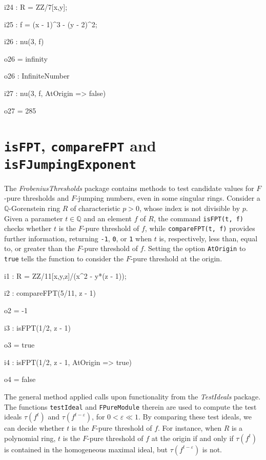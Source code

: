 \documentclass{amsart}
\begin{document}
\smallskip
{\small
{}
\begin{MyVerbatim}
i24 : R = ZZ/7[x,y];

i25 : f = (x - 1)^3 - (y - 2)^2;

i26 : nu(3, f)

o26 = infinity

o26 : InfiniteNumber

i27 : nu(3, f, AtOrigin => false)

o27 = 285
\end{MyVerbatim}
}

\section{{\tt isFPT}, {\tt compareFPT} and {\tt isFJumpingExponent}}
\label{sec.IsFPT}

The \emph{FrobeniusThresholds} package contains methods to test candidate values for $F$-pure thresholds and $F$-jumping numbers, even in some singular rings.
Consider a  $\mathbb{Q}$-Gorenstein ring $R$ of characteristic $p>0$, whose index is not divisible by $p$.
Given a parameter $t\in \mathbb{Q}$ and an element $f$ of $R$, the command \texttt{isFPT(t, f)} checks whether $t$ is the $F$-pure threshold of $f$, while \texttt{compareFPT(t, f)} provides further information, returning {\tt-1}, \texttt{0}, or \texttt{1} when $t$ is, respectively, less than, equal to, or greater than the $F$-pure threshold of $f$.  Setting the option \texttt{AtOrigin} to \texttt{true} tells the function to consider the $F$-pure threshold at the origin.  %

\smallskip
{\small
{}
\begin{MyVerbatim}
i1 : R = ZZ/11[x,y,z]/(x^2 - y*(z - 1));

i2 : compareFPT(5/11, z - 1)

o2 = -1

i3 : isFPT(1/2, z - 1)

o3 = true

i4 : isFPT(1/2, z - 1, AtOrigin => true)

o4 = false
\end{MyVerbatim}
}
\smallskip

The general method applied calls upon functionality from the \emph{TestIdeals} package.
The functions \texttt{testIdeal} and \texttt{FPureModule} therein are used to compute the test ideals $\tau(f^t)$ and $\tau(f^{t-\varepsilon})$, for $0<\varepsilon\ll 1$.
By comparing these test ideals, we can decide whether $t$ is the $F$-pure threshold of $f$.
For instance, when $R$ is a polynomial ring, $t$ is the $F$-pure threshold of $f$ at the origin if and only if $\tau(f^t)$ is contained in the homogeneous maximal ideal, but $\tau(f^{t-\varepsilon})$ is not.
\end{document}
